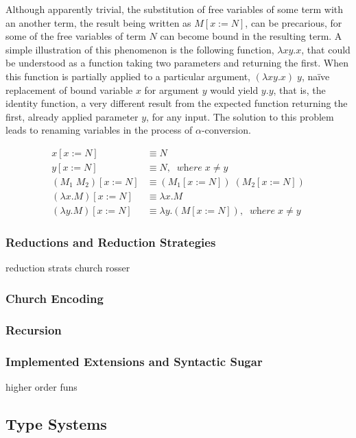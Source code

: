 \documentclass[a4paper,10pt]{article}
\begin{document}
Although apparently trivial, the substitution of free variables of some term with an another term,
the result being written as $M[x := N]$, can be precarious, for some of the 
free variables of term $N$ can become bound in the resulting term. A simple illustration of this
phenomenon is the following function, $\lambda xy.x$, that could be understood as a function
taking two parameters and returning the first. When this function is partially
applied to a particular argument, $(\lambda xy.x)\;y$, na\"ive replacement of 
bound variable $x$ for argument $y$ would yield
$y.y$, that is, the identity function, a very different result from the expected function returning
the first, already applied parameter $y$, for any input. The solution to this problem leads
to renaming variables in the process of $\alpha$-conversion.

\begin{align}
	x[x := N] &\equiv N\\
	y[x := N] &\equiv N,\;\;\textit{where}\;x \not= y\\
	(M_1\;M_2)[x := N] &\equiv (M_1[x := N])\;(M_2[x := N])\\
	(\lambda x.M)[x := N] &\equiv \lambda x.M\\
	(\lambda y.M)[x := N] &\equiv \lambda y.(M[x := N]),\;\;\textit{where}\;x \not= y
\end{align}

\subsubsection{Reductions and Reduction Strategies}

reduction strats
church rosser

\subsubsection{Church Encoding}
\subsubsection{Recursion}
\subsubsection{Implemented Extensions and Syntactic Sugar}

higher order funs

\subsection{Type Systems}
\end{document}
